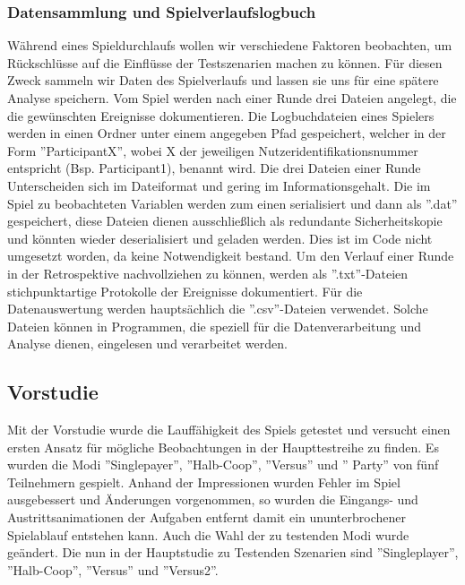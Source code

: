 \subsubsection{Datensammlung und Spielverlaufslogbuch}
Während eines Spieldurchlaufs wollen wir verschiedene Faktoren beobachten, um Rückschlüsse auf die Einflüsse der Testszenarien  machen zu können. Für diesen Zweck sammeln wir  Daten des Spielverlaufs und lassen sie uns für eine spätere Analyse speichern. Vom Spiel werden nach einer Runde drei Dateien angelegt, die die gewünschten Ereignisse dokumentieren. Die Logbuchdateien eines Spielers werden in einen Ordner unter einem angegeben Pfad gespeichert, welcher in der Form ''ParticipantX'', wobei X der jeweiligen Nutzeridentifikationsnummer entspricht (Bsp. Participant1), benannt wird. Die drei Dateien einer Runde Unterscheiden sich im Dateiformat und gering  im Informationsgehalt. Die im Spiel zu beobachteten Variablen werden zum einen serialisiert und dann als ''.dat'' gespeichert, diese Dateien dienen ausschließlich als redundante Sicherheitskopie und könnten wieder deserialisiert und  geladen werden. Dies ist im Code nicht umgesetzt worden, da keine Notwendigkeit bestand.\newline
Um den Verlauf einer Runde in der Retrospektive nachvollziehen zu können, werden als ''.txt''-Dateien stichpunktartige Protokolle der Ereignisse dokumentiert.\newline
Für die Datenauswertung  werden hauptsächlich die ''.csv''-Dateien verwendet. Solche Dateien können in Programmen, die speziell für die Datenverarbeitung  und Analyse dienen, eingelesen und verarbeitet werden.
\subsection{Vorstudie}
Mit der Vorstudie wurde die Lauffähigkeit des Spiels getestet und versucht einen ersten Ansatz für mögliche Beobachtungen in der Haupttestreihe zu finden. Es wurden die Modi ''Singlepayer'', ''Halb-Coop'', ''Versus'' und '' Party'' von fünf Teilnehmern gespielt. Anhand der Impressionen wurden Fehler im Spiel ausgebessert und Änderungen vorgenommen, so wurden die Eingangs- und Austrittsanimationen der Aufgaben entfernt damit ein ununterbrochener Spielablauf entstehen kann. Auch die Wahl der zu testenden Modi wurde geändert. Die nun in der Hauptstudie zu Testenden Szenarien sind  ''Singleplayer'', ''Halb-Coop'', ''Versus'' und ''Versus2''.

